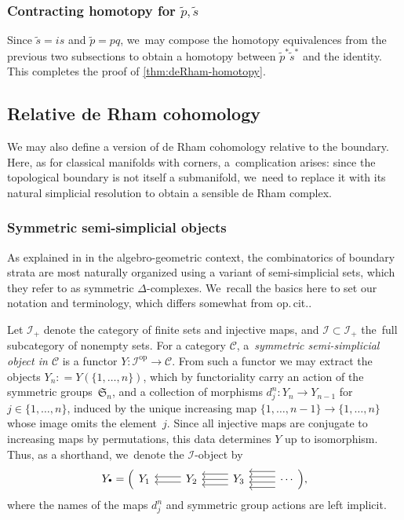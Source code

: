 \documentclass[10pt]{amsart}
\let\oldbullet\bullet
\renewcommand{\bullet}{{\raisebox{1pt}{$\scriptscriptstyle\oldbullet$}}}
\newcommand{\rBrac}[1]{\Bigl(#1\Bigr)}
\theoremstyle{definition}
\theoremstyle{remark}
\let\defn\emph
\newcommand{\tp}{\tilde p}
\newcommand{\ts}{\tilde s}
\newcommand{\defas}{\mathrel{\mathop:}=}
\newcommand{\symgp}[1]{\mathfrak{S}_{#1}}
\newcommand{\simp}[3]
{
\begin{tikzcd}[ampersand replacement=\&]
     {#1} \& {#2} \ar[l,shift left = 1]\ar[l,shift right=1] \& {#3} \ar[l,shift left = 2]\ar[l,shift left = 0]\ar[l,shift left = -2] \& \ar[l,shift left = 3]\ar[l,shift left = 1]\ar[l,shift left = -1]\ar[l,shift left = -3] \cdots
    \end{tikzcd}
}
\newcommand{\scat}{\mathscr{I}}
\newcommand{\ascat}{\mathscr{I}_+}
\newcommand{\op}{\mathrm{op}}
\begin{document}
\subsubsection{Contracting homotopy for $\tp,\ts$}\label{sec:deRham-htpy3}

Since $\ts = is$ and $\tp = p q$, we~may compose the homotopy equivalences from the previous two subsections to obtain a homotopy between $\tp^*\ts^*$ and the identity. This completes the proof of \autoref{thm:deRham-homotopy}.

\subsection{Relative de Rham cohomology}
\label{sec:relative-cohomology}

We may also define a version of de Rham cohomology relative to the boundary. Here, as for classical manifolds with corners, a~complication arises: since the topological boundary is not itself a submanifold, we~need to replace it with its natural simplicial resolution to obtain a sensible de Rham complex.

\subsubsection{Symmetric semi-simplicial objects}\label{sec:semi-simplicial-objects}
As explained in \cite{ChanGalatiusPayne} in the algebro-geometric context, the combinatorics of boundary strata are most naturally organized using a variant of semi-simplicial sets, which they refer to as symmetric $\Delta$-complexes. We~recall the basics here to set our notation and terminology, which differs somewhat from {op.\,cit.}.

Let $\ascat$ denote the category of finite sets and injective maps, and $\scat\!\subset\!\ascat$ the~full subcategory of nonempty sets. For a category $\mathscr{C}$, a~\defn{symmetric semi-simplicial object in $\mathscr{C}$} is a functor $Y\colon \scat^\op \to \mathscr{C}$. From such a functor we may extract the objects $Y_n \!\defas\! Y(\{1,\ldots,n\})$, which by functoriality carry an action of the symmetric groups~$\symgp{n}$, and a collection of morphisms $d_j^n \colon Y_n \to Y_{n-1}$ for $j \in \{1,\ldots, n\}$, induced by the unique increasing map $\{1,\ldots,n-1\} \to \{1,\ldots,n\}$ whose image omits the element~$j$. Since all injective maps are conjugate to increasing maps by permutations, this data determines $Y$ up to isomorphism. Thus, as a shorthand, we~denote the $\scat$-object by\vspace*{-3pt}
\[
Y_\bullet = \rBrac{\simp{Y_1}{Y_2}{Y_3}},
\]
where the names of the maps $d_j^n$ and symmetric group actions are left implicit.
\end{document}
